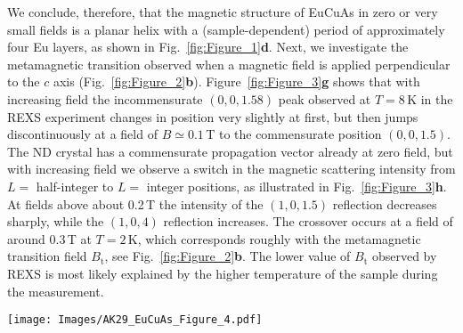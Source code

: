 \documentclass[aps,prl,amsmath,amssymb,amstext,citeautoscript,punctuation,nofootinbib,superscriptaddress,twocolumn]{revtex4-1}
\newcommand{\eca}{EuCuAs}
\begin{document}
We conclude, therefore, that the magnetic structure of EuCuAs in zero or very small fields is a planar helix with a (sample-dependent) period of approximately four Eu layers, as shown in Fig.~\ref{fig:Figure_1}\textbf{d}. 
Next, we investigate the metamagnetic transition observed when a magnetic field is applied perpendicular to the $c$ axis (Fig.~\ref{fig:Figure_2}\textbf{b}).  Figure~\ref{fig:Figure_3}\textbf{g} shows that with increasing field the incommensurate $(0,0,1.58)$ peak observed at $T = 8$\,K in the REXS experiment changes in position very slightly at first, but then jumps discontinuously at a field of $B \simeq 0.1$\,T  to the commensurate position $(0,0,1.5)$.  The ND crystal has a commensurate propagation vector already at zero field, but with increasing field we observe a switch in the magnetic scattering intensity from $L = $ half-integer to $L = $ integer positions, as illustrated in Fig.~\ref{fig:Figure_3}\textbf{h}. At fields above about 0.2\,T the intensity of the $(1, 0, 1.5)$ reflection  decreases sharply, while the $(1,0,4)$ reflection increases. The crossover occurs at a field of around 0.3\,T at $T = 2$\,K, which corresponds roughly with the metamagnetic transition field $B_\textrm{t}$, see Fig.~\ref{fig:Figure_2}\textbf{b}. The lower value of $B_\textrm{t}$ observed by REXS is most likely explained by the higher temperature of the sample during the measurement.   	
\begin{figure*}[t!]
\texttt{[image: Images/AK29\_EuCuAs\_Figure\_4.pdf]}
\caption{\label{fig:Figure_4} \textbf{Comparison between the calculated and measured electronic band structure of \eca{}.} \textbf{a}-\textbf{g} \textit{Ab-initio} electronic structure calculations. \textbf{a} Dispersion along high symmetry lines with helical magnetic order. \textbf{b} Comparison between the dispersion along $\Gamma$-A for a helical magnetic configuration (solid line) and DP-AFM structure (dotted line). \textbf{c} Hexagonal Brillouin zone of \eca{}. \textbf{d}-\textbf{g} Cross-section of the three-dimensional band structure, dispersion along K$-$$\Gamma$$-$K, and constant energy maps at $E_\mathrm{F}$ and 0.2\,eV, respectively. An upward shift of 0.4\,eV has been applied to the calculated bands shown in order to match the ARPES data. The folded bands near $\Gamma$ at about $-0.5$\,eV (unshifted energy) have very little spectral weight and are omitted for clarity (see Supplementary Information). \textbf{h}-\textbf{k} measured ARPES spectrum at $T=5$\,K. }
\end{figure*}
\end{document}
